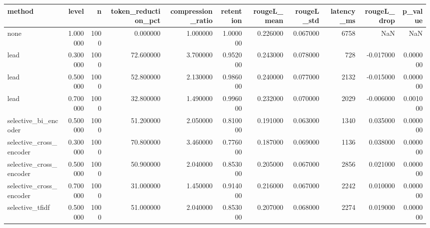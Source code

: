 \begin{tabular}{lrrrrrrrrrr}
\toprule
method & level & n & token_reduction_pct & compression_ratio & retention & rougeL_mean & rougeL_std & latency_ms & rougeL_drop & p_value \\
\midrule
none & 1.000000 & 1000 & 0.000000 & 1.000000 & 1.000000 & 0.226000 & 0.067000 & 6758 & NaN & NaN \\
lead & 0.300000 & 1000 & 72.600000 & 3.700000 & 0.952000 & 0.243000 & 0.078000 & 728 & -0.017000 & 0.000000 \\
lead & 0.500000 & 1000 & 52.800000 & 2.130000 & 0.986000 & 0.240000 & 0.077000 & 2132 & -0.015000 & 0.000000 \\
lead & 0.700000 & 1000 & 32.800000 & 1.490000 & 0.996000 & 0.232000 & 0.070000 & 2029 & -0.006000 & 0.001000 \\
selective_bi_encoder & 0.500000 & 1000 & 51.200000 & 2.050000 & 0.810000 & 0.191000 & 0.063000 & 1340 & 0.035000 & 0.000000 \\
selective_cross_encoder & 0.300000 & 1000 & 70.800000 & 3.460000 & 0.776000 & 0.187000 & 0.069000 & 1136 & 0.038000 & 0.000000 \\
selective_cross_encoder & 0.500000 & 1000 & 50.900000 & 2.040000 & 0.853000 & 0.205000 & 0.067000 & 2856 & 0.021000 & 0.000000 \\
selective_cross_encoder & 0.700000 & 1000 & 31.000000 & 1.450000 & 0.914000 & 0.216000 & 0.067000 & 2242 & 0.010000 & 0.000000 \\
selective_tfidf & 0.500000 & 1000 & 51.000000 & 2.040000 & 0.853000 & 0.207000 & 0.068000 & 2274 & 0.019000 & 0.000000 \\
\bottomrule
\end{tabular}
